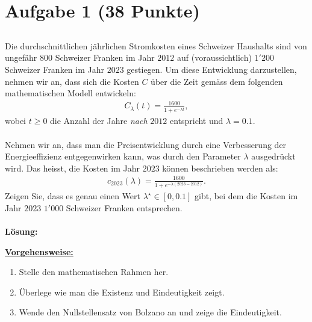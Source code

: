 \vspace{1cm}
\renewcommand{\labelenumi}{\theenumi.}
\section*{Aufgabe 1 (38 Punkte)}
\vspace{0.4cm}
\subsection*{} 
Die durchschnittlichen jährlichen Stromkosten eines Schweizer Haushalts sind von ungefähr $800$ Schweizer Franken im Jahr $2012$ auf (voraussichtlich) $1'200$ Schweizer Franken im Jahr $2023$ gestiegen. Um diese Entwicklung darzustellen, nehmen wir an, dass sich die Kosten $C$ über die Zeit gemäss dem folgenden mathematischen Modell entwickeln:
\begin{align*}
	C_\lambda(t)
	=
	\frac{1600}{1 + e^{-\lambda t}},
\end{align*}
wobei $t \geq 0$ die Anzahl der Jahre \textit{nach} $2012$ entspricht und $\lambda = 0.1$.
\\
\\
Nehmen wir an, dass man die Preisentwicklung durch eine Verbesserung der Energieeffizienz entgegenwirken kann, was durch den Parameter $\lambda$ ausgedrückt wird. Das heisst, die Kosten im Jahr $2023$ können beschrieben werden als:
\begin{align*}
	c_{2023}(\lambda) 
	=
	\frac{1600}{1 + e^{- \lambda (2023 - 2012)}}.
\end{align*}
Zeigen Sie, dass es genau einen Wert $\lambda^\star \in [0,0.1]$ gibt, bei dem die Kosten im Jahr $2023$ $1'000$ Schweizer Franken entsprechen.
\
\\ \\
\textbf{Lösung:}
\begin{mdframed}
\underline{\textbf{Vorgehensweise:}}
\renewcommand{\labelenumi}{\theenumi.}
\begin{enumerate}
\item 
Stelle den mathematischen Rahmen her.
\item
Überlege wie man die Existenz und Eindeutigkeit zeigt.
\item
Wende den Nullstellensatz von Bolzano an und zeige die Eindeutigkeit. 
\end{enumerate}
\end{mdframed}
